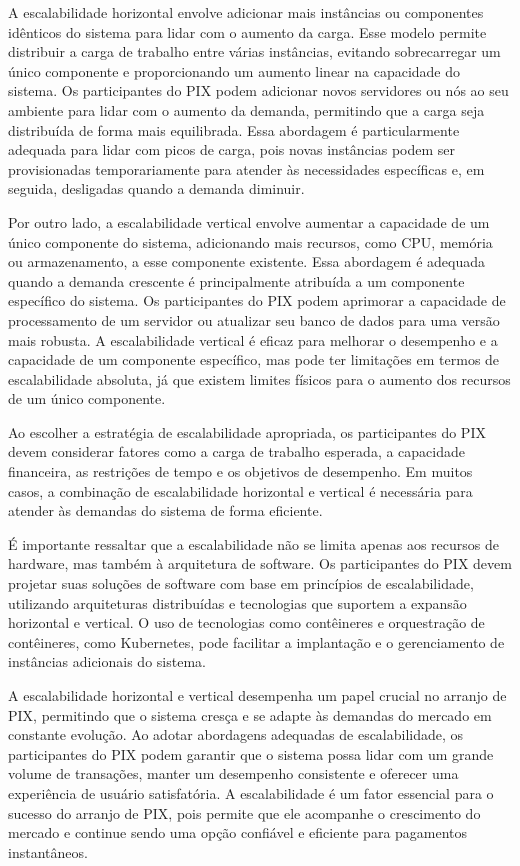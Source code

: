\documentclass[12pt]{article}
\begin{document}
A escalabilidade horizontal envolve adicionar mais instâncias ou componentes idênticos do sistema para lidar com o aumento da carga. Esse modelo permite distribuir a carga de trabalho entre várias instâncias, evitando sobrecarregar um único componente e proporcionando um aumento linear na capacidade do sistema. Os participantes do PIX podem adicionar novos servidores ou nós ao seu ambiente para lidar com o aumento da demanda, permitindo que a carga seja distribuída de forma mais equilibrada. Essa abordagem é particularmente adequada para lidar com picos de carga, pois novas instâncias podem ser provisionadas temporariamente para atender às necessidades específicas e, em seguida, desligadas quando a demanda diminuir.

Por outro lado, a escalabilidade vertical envolve aumentar a capacidade de um único componente do sistema, adicionando mais recursos, como CPU, memória ou armazenamento, a esse componente existente. Essa abordagem é adequada quando a demanda crescente é principalmente atribuída a um componente específico do sistema. Os participantes do PIX podem aprimorar a capacidade de processamento de um servidor ou atualizar seu banco de dados para uma versão mais robusta. A escalabilidade vertical é eficaz para melhorar o desempenho e a capacidade de um componente específico, mas pode ter limitações em termos de escalabilidade absoluta, já que existem limites físicos para o aumento dos recursos de um único componente.

Ao escolher a estratégia de escalabilidade apropriada, os participantes do PIX devem considerar fatores como a carga de trabalho esperada, a capacidade financeira, as restrições de tempo e os objetivos de desempenho. Em muitos casos, a combinação de escalabilidade horizontal e vertical é necessária para atender às demandas do sistema de forma eficiente.

É importante ressaltar que a escalabilidade não se limita apenas aos recursos de hardware, mas também à arquitetura de software. Os participantes do PIX devem projetar suas soluções de software com base em princípios de escalabilidade, utilizando arquiteturas distribuídas e tecnologias que suportem a expansão horizontal e vertical. O uso de tecnologias como contêineres e orquestração de contêineres, como Kubernetes, pode facilitar a implantação e o gerenciamento de instâncias adicionais do sistema.

A escalabilidade horizontal e vertical desempenha um papel crucial no arranjo de PIX, permitindo que o sistema cresça e se adapte às demandas do mercado em constante evolução. Ao adotar abordagens adequadas de escalabilidade, os participantes do PIX podem garantir que o sistema possa lidar com um grande volume de transações, manter um desempenho consistente e oferecer uma experiência de usuário satisfatória. A escalabilidade é um fator essencial para o sucesso do arranjo de PIX, pois permite que ele acompanhe o crescimento do mercado e continue sendo uma opção confiável e eficiente para pagamentos instantâneos.
\end{document}
